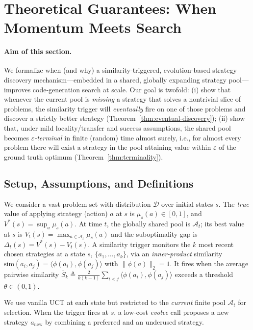 \section{Theoretical Guarantees: When Momentum Meets Search}\label{sec:theoretical_analysis}

\paragraph{Aim of this section.}
We formalize when (and why) a similarity-triggered, evolution-based strategy discovery mechanism---embedded in a shared, globally expanding strategy pool---improves code-generation search at scale. Our goal is twofold:
(i) show that whenever the current pool is \emph{missing} a strategy that solves a nontrivial slice of problems, the similarity trigger will \emph{eventually} fire on one of those problems and discover a strictly better strategy (Theorem~\ref{thm:eventual-discovery});
(ii) show that, under mild locality/transfer and success assumptions, the shared pool becomes \emph{$\varepsilon$-terminal} in finite (random) time almost surely, i.e., for almost every problem there will exist a strategy in the pool attaining value within $\varepsilon$ of the ground truth optimum (Theorem~\ref{thm:terminality}).

\subsection{Setup, Assumptions, and Definitions}

We consider a vast problem set with distribution $\mathcal D$ over initial states $s$. The \emph{true} value of applying strategy (action) $a$ at $s$ is $\mu_s(a)\in[0,1]$, and $V^*(s)=\sup_{a}\mu_s(a)$. At time $t$, the globally shared pool is $\mathcal A_t$; its best value at $s$ is $V_t(s)=\max_{a\in\mathcal A_t}\mu_s(a)$ and the suboptimality gap is $\Delta_t(s)=V^*(s)-V_t(s)$. 
A similarity trigger monitors the $k$ most recent chosen strategies at a state $s$, $\{a_1,\dots,a_k\}$, via an \emph{inner-product} similarity $\mathrm{sim}(a_i,a_j)=\langle \phi(a_i),\phi(a_j)\rangle$ with $\|\phi(a)\|_2=1$. It fires when the average pairwise similarity $\bar S_k \triangleq \tfrac{2}{k(k-1)}\sum_{i<j}\langle\phi(a_i),\phi(a_j)\rangle$ exceeds a threshold $\theta\in(0,1)$.

We use vanilla UCT at each state but restricted to the \emph{current} finite pool $\mathcal A_t$ for selection. When the trigger fires at $s$, a low-cost \emph{evolve} call proposes a new strategy $a_{\mathrm{new}}$ by combining a preferred and an underused strategy.

